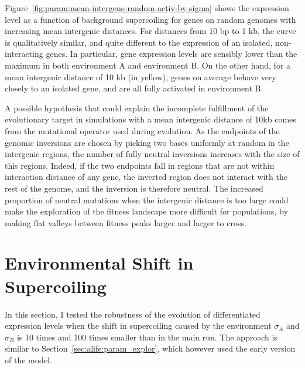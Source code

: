Figure~\ref{fig:param:mean-intergene-random-activ-by-sigma} shows the expression level as a function of background supercoiling for genes on random genomes with increasing mean intergenic distances.
For distances from 10 bp to 1 kb, the curve is qualitatively similar, and quite different to the expression of an isolated, non-interacting genes.
In particular, gene expression levels are sensibly lower than the maximum in both environment A and environment B.
On the other hand, for a mean intergenic distance of 10 kb (in yellow), genes on average behave very closely to an isolated gene, and are all fully activated in environment B.

A possible hypothesis that could explain the incomplete fulfillment of the evolutionary target in simulations with a mean intergenic distance of 10kb comes from the mutational operator used during evolution.
As the endpoints of the genomic inversions are chosen by picking two bases uniformly at random in the intergenic regions, the number of fully neutral inversions increases with the size of this regions.
Indeed, if the two endpoints fall in regions that are not within interaction distance of any gene, the inverted region does not interact with the rest of the genome, and the inversion is therefore neutral.
The increased proportion of neutral mutations when the intergenic distance is too large could make the exploration of the fitness landscape more difficult for populations, by making flat valleys between fitness peaks larger and larger to cross.

\FloatBlock


\section{Environmental Shift in Supercoiling}

In this section, I tested the robustness of the evolution of differentiated expression levels when the shift in supercoiling caused by the environment $\sigma_A$ and $\sigma_B$ is 10 times and 100 times smaller than in the main run.
The approach is similar to Section~\ref{sec:alife:param_explor}, which however used the early version of the model.

